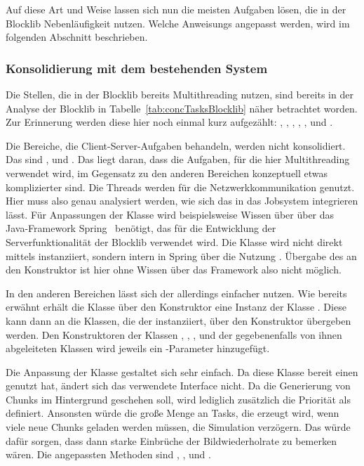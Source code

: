 Auf diese Art und Weise lassen sich nun die meisten Aufgaben lösen, die in der Blocklib Nebenläufigkeit nutzen. Welche \glspl{Anweisung} angepasst werden, wird im folgenden Abschnitt beschrieben.

\subsubsection{Konsolidierung mit dem bestehenden System}\label{sec:Konsolidierung}

Die Stellen, die in der Blocklib bereits Multithreading nutzen, sind bereits in der Analyse der Blocklib in Tabelle~\ref{tab:concTasksBlocklib} näher betrachtet worden. Zur Erinnerung werden diese hier noch einmal kurz aufgezählt: , , , , ,  und .

Die Bereiche, die Client-Server-Aufgaben behandeln, werden nicht konsolidiert. Das sind ,  und . Das liegt daran, dass die Aufgaben, für die hier Multithreading verwendet wird, im Gegensatz zu den anderen Bereichen konzeptuell etwas komplizierter sind. Die Threads werden für die Netzwerkkommunikation genutzt. Hier muss also genau analysiert werden, wie sich das in das Jobsystem integrieren lässt. Für Anpassungen der Klasse  wird beispielsweise Wissen über über das Java-Framework Spring~\cite{VMware2022} benötigt, das für die Entwicklung der Serverfunktionalität der Blocklib verwendet wird. Die Klasse wird nicht direkt mittels  instanziiert, sondern intern in Spring über die Nutzung . Übergabe des  an den Konstruktor ist hier ohne Wissen über das Framework also nicht möglich.

In den anderen Bereichen lässt sich der  allerdings einfacher nutzen. Wie bereits erwähnt erhält die Klasse  über den Konstruktor eine Instanz der Klasse . Diese kann dann an die Klassen, die der  instanziiert, über den Konstruktor übergeben werden. Den Konstruktoren der Klassen , , ,  und der gegebenenfalls von ihnen abgeleiteten Klassen wird jeweils ein -Parameter hinzugefügt.

Die Anpassung der Klasse  gestaltet sich sehr einfach. Da diese Klasse bereit einen  genutzt hat, ändert sich das verwendete Interface nicht. Da die Generierung von Chunks im Hintergrund geschehen soll, wird lediglich zusätzlich die Priorität als  definiert. Ansonsten würde die große Menge an Tasks, die erzeugt wird, wenn viele neue Chunks geladen werden müssen, die Simulation verzögern. Das würde dafür sorgen, dass dann starke Einbrüche der Bildwiederholrate zu bemerken wären. Die angepassten Methoden sind	, ,  und .

